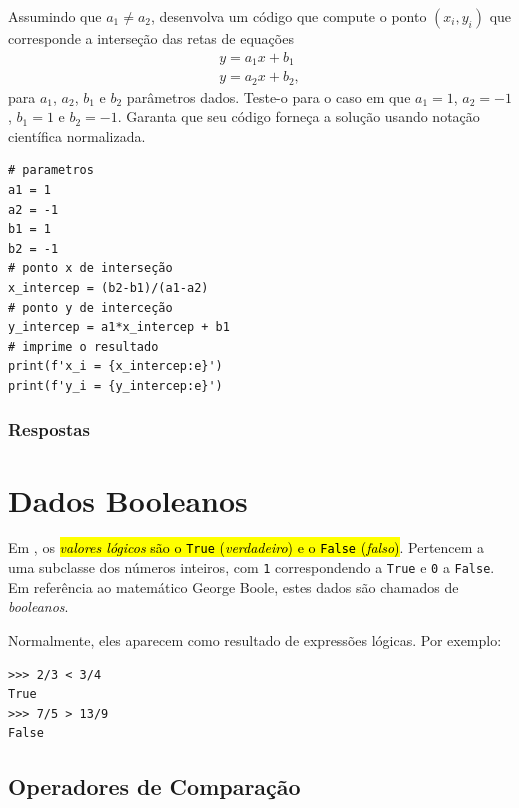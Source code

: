 \begin{exer}
  Assumindo que $a_1\neq a_2$, desenvolva um código {\python} que compute o ponto $(x_{i}, y_i)$ que corresponde a interseção das retas de equações
  \begin{gather}
    y = a_1x + b_1\\
    y = a_2x + b_2,
  \end{gather}
  para $a_1$, $a_2$, $b_1$ e $b_2$ parâmetros dados. Teste-o para o caso em que $a_1=1$, $a_2=-1$, $b_1=1$ e $b_2=-1$. Garanta que seu código forneça a solução usando notação científica normalizada.
\end{exer}
\begin{resp}

\begin{lstlisting}
# parametros
a1 = 1
a2 = -1
b1 = 1
b2 = -1
# ponto x de interseção
x_intercep = (b2-b1)/(a1-a2)
# ponto y de interceção
y_intercep = a1*x_intercep + b1
# imprime o resultado
print(f'x_i = {x_intercep:e}')
print(f'y_i = {y_intercep:e}')
\end{lstlisting}

\end{resp}

\ifisbook
\subsubsection{Respostas}
\shipoutAnswer
\fi


\section{Dados Booleanos}\label{cap_lingua_sec_bool}

Em {\python}, os \hl{\emph{valores lógicos} são o \texttt{True} (\emph{verdadeiro}) e o \texttt{False} (\emph{falso})}. Pertencem a uma subclasse dos números inteiros, com \lstinline+1+ correspondendo a \lstinline+True+ e \lstinline+0+ a \lstinline+False+. Em referência ao matemático George Boole{\boole}, estes dados são chamados de \emph{booleanos}.

Normalmente, eles aparecem como resultado de expressões lógicas. Por exemplo:

\begin{lstlisting}
>>> 2/3 < 3/4
True
>>> 7/5 > 13/9
False
\end{lstlisting}

\subsection{Operadores de Comparação}


